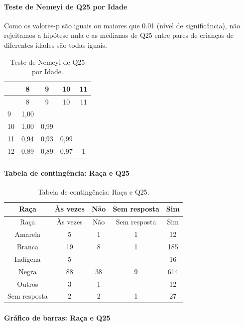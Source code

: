 \documentclass[]{article}
\let\oldparagraph\paragraph
\renewcommand{\paragraph}[1]{\oldparagraph{#1}\mbox{}}
\begin{document}
\hypertarget{teste-de-nemeyi-de-q25-por-idade}{%
\paragraph{Teste de Nemeyi de Q25 por Idade}\label{teste-de-nemeyi-de-q25-por-idade}}

Como os valores-p são iguais ou maiores que 0.01 (nível de significância), não rejeitamos a hipótese nula e as medianas de Q25 entre pares de crianças de diferentes idades são todas iguais.

\begin{longtable}[]{@{}lcccc@{}}
\caption{\label{tab:unnamed-chunk-691}Teste de Nemeyi de Q25 por Idade.}\tabularnewline
\toprule
& 8 & 9 & 10 & 11\tabularnewline
\midrule
\endfirsthead
\toprule
& 8 & 9 & 10 & 11\tabularnewline
\midrule
\endhead
9 & 1,00 & & &\tabularnewline
10 & 1,00 & 0,99 & &\tabularnewline
11 & 0,94 & 0,93 & 0,99 &\tabularnewline
12 & 0,89 & 0,89 & 0,97 & 1\tabularnewline
\bottomrule
\end{longtable}

\cleardoublepage

\hypertarget{tabela-de-continguxeancia-rauxe7a-e-q25}{%
\paragraph{Tabela de contingência: Raça e Q25}\label{tabela-de-continguxeancia-rauxe7a-e-q25}}

\begin{longtable}[]{@{}ccccc@{}}
\caption{\label{tab:unnamed-chunk-692}Tabela de contingência: Raça e Q25.}\tabularnewline
\toprule
Raça & Às vezes & Não & Sem resposta & Sim\tabularnewline
\midrule
\endfirsthead
\toprule
Raça & Às vezes & Não & Sem resposta & Sim\tabularnewline
\midrule
\endhead
Amarela & 5 & 1 & 1 & 12\tabularnewline
Branca & 19 & 8 & 1 & 185\tabularnewline
Indígena & 5 & & & 16\tabularnewline
Negra & 88 & 38 & 9 & 614\tabularnewline
Outros & 3 & 1 & & 12\tabularnewline
Sem resposta & 2 & 2 & 1 & 27\tabularnewline
\bottomrule
\end{longtable}

\hypertarget{gruxe1fico-de-barras-rauxe7a-e-q25}{%
\paragraph{Gráfico de barras: Raça e Q25}\label{gruxe1fico-de-barras-rauxe7a-e-q25}}
\end{document}
